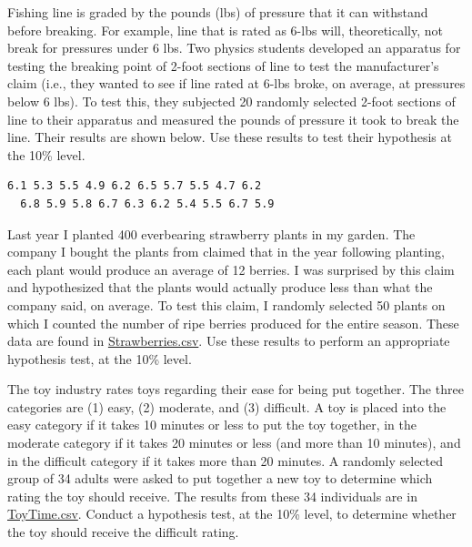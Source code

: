 \documentclass[10pt,openany]{book}\usepackage[]{graphicx}\usepackage[]{color}
\begin{document}
\newpage
\begin{exsection}
  \item \label{revex:tTestFishLine} \rhw{} Fishing line is graded by the pounds (lbs) of pressure that it can withstand before breaking.  For example, line that is rated as 6-lbs will, theoretically, not break for pressures under 6 lbs.  Two physics students developed an apparatus for testing the breaking point of 2-foot sections of line to test the manufacturer's claim (i.e., they wanted to see if line rated at 6-lbs broke, on average, at pressures below 6 lbs).  To test this, they subjected 20 randomly selected 2-foot sections of line to their apparatus and measured the pounds of pressure it took to break the line.  Their results are shown below.  Use these results to test their hypothesis at the 10\% level. 
\begin{Verbatim}[xleftmargin=5mm]
  6.1 5.3 5.5 4.9 6.2 6.5 5.7 5.5 4.7 6.2
  6.8 5.9 5.8 6.7 6.3 6.2 5.4 5.5 6.7 5.9
\end{Verbatim}

  \item \label{revex:tTestStrawberries} \rhw{} Last year I planted 400 everbearing strawberry plants in my garden.  The company I bought the plants from claimed that in the year following planting, each plant would produce an average of 12 berries.  I was surprised by this claim and hypothesized that the plants would actually produce less than what the company said, on average.  To test this claim, I randomly selected 50 plants on which I counted the number of ripe berries produced for the entire season.  These data are found in \href{https://raw.githubusercontent.com/droglenc/NCData/master/Strawberries.csv}{Strawberries.csv}.  Use these results to perform an appropriate hypothesis test, at the 10\% level. 

  \item \label{revex:tTestToyRate} \rhw{} The toy industry rates toys regarding their ease for being put together.  The three categories are (1) easy, (2) moderate, and (3) difficult.  A toy is placed into the easy category if it takes 10 minutes or less to put the toy together, in the moderate category if it takes 20 minutes or less (and more than 10 minutes), and in the difficult category if it takes more than 20 minutes.  A randomly selected group of 34 adults were asked to put together a new toy to determine which rating the toy should receive.  The results from these 34 individuals are in \href{https://raw.githubusercontent.com/droglenc/NCData/master/ToyTime.csv}{ToyTime.csv}.  Conduct a hypothesis test, at the 10\% level, to determine whether the toy should receive the difficult rating. 


\end{exsection}
\end{document}
